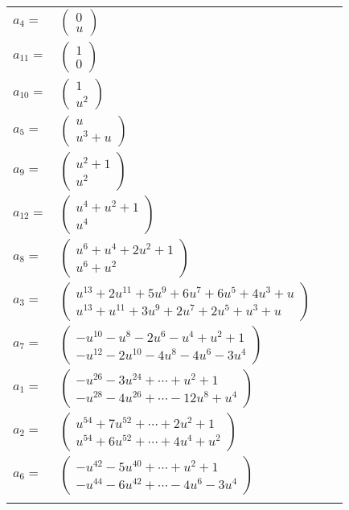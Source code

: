 \documentclass[1p]{elsarticle_modified}
\theoremstyle{definition}
\begin{document}
\begin{tabular}{m{7pt} m{180pt} m{7pt} m{180pt} }
\flushright $a_{4}=$&$\begin{pmatrix}0\\u\end{pmatrix}$ \\
\flushright $a_{11}=$&$\begin{pmatrix}1\\0\end{pmatrix}$ \\
\flushright $a_{10}=$&$\begin{pmatrix}1\\u^2\end{pmatrix}$ \\
\flushright $a_{5}=$&$\begin{pmatrix}u\\u^3+u\end{pmatrix}$ \\
\flushright $a_{9}=$&$\begin{pmatrix}u^2+1\\u^2\end{pmatrix}$ \\
\flushright $a_{12}=$&$\begin{pmatrix}u^4+u^2+1\\u^4\end{pmatrix}$ \\
\flushright $a_{8}=$&$\begin{pmatrix}u^6+u^4+2 u^2+1\\u^6+u^2\end{pmatrix}$ \\
\flushright $a_{3}=$&$\begin{pmatrix}u^{13}+2 u^{11}+5 u^9+6 u^7+6 u^5+4 u^3+u\\u^{13}+u^{11}+3 u^9+2 u^7+2 u^5+u^3+u\end{pmatrix}$ \\
\flushright $a_{7}=$&$\begin{pmatrix}- u^{10}- u^8-2 u^6- u^4+u^2+1\\- u^{12}-2 u^{10}-4 u^8-4 u^6-3 u^4\end{pmatrix}$ \\
\flushright $a_{1}=$&$\begin{pmatrix}- u^{26}-3 u^{24}+\cdots+u^2+1\\- u^{28}-4 u^{26}+\cdots-12 u^8+u^4\end{pmatrix}$ \\
\flushright $a_{2}=$&$\begin{pmatrix}u^{54}+7 u^{52}+\cdots+2 u^2+1\\u^{54}+6 u^{52}+\cdots+4 u^4+u^2\end{pmatrix}$ \\
\flushright $a_{6}=$&$\begin{pmatrix}- u^{42}-5 u^{40}+\cdots+u^2+1\\- u^{44}-6 u^{42}+\cdots-4 u^6-3 u^4\end{pmatrix}$\\&\end{tabular}
\end{document}
